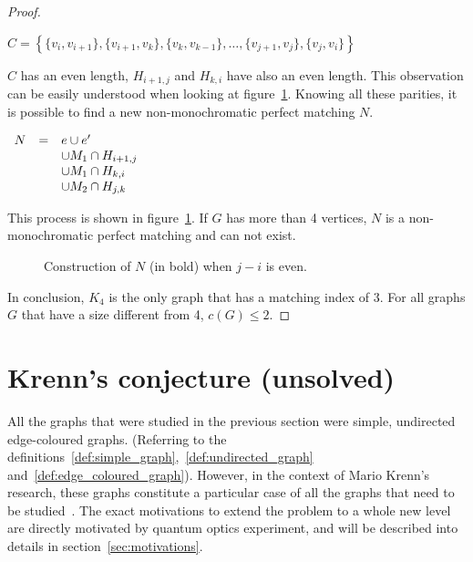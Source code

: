\begin{proof}
\begin{itemize}
            \begin{center}
                $C = \left\{
                    \{v_i, v_{i + 1}\}, \{v_{i+1}, v_k\}, \{v_k, v_{k - 1}\}, \dots, \{v_{j+1}, v_j\}, \{v_j, v_i\}
                \right\}$
            \end{center}
            
            $C$ has an even length, $H_{i+1, j}$ and $H_{k, i}$ have also an even length.
            This observation can be easily understood when looking at figure~\ref{fig:proof_simplified_even}.
            Knowing all these parities, it is possible to find a new non-monochromatic perfect matching $N$.
            
            \begin{center}
                $\begin{array}{r c l}
                    N & = & e \cup e' \\
                      &   & \cup M_1 \cap H_{i+1, j} \\
                      &   & \cup M_1 \cap H_{k, i} \\
                      &   & \cup M_2 \cap H_{j, k}
                \end{array}$
            \end{center}
            
            This process is shown in figure~\ref{fig:proof_simplified_even}.
            If $G$ has more than 4 vertices, $N$ is a non-monochromatic perfect matching and can not exist.
            
            \begin{figure}[H]
                \caption{Construction of $N$ (in bold) when $j - i$ is even.}
                \label{fig:proof_simplified_even}
            \end{figure}
    \end{itemize}

    In conclusion, $K_4$ is the only graph that has a matching index of 3.
    For all graphs $G$ that have a size different from 4, $c(G) \leq 2$.
\end{proof}


\section{Krenn's conjecture (unsolved)}
\label{sec:krenn_conjecture}

All the graphs that were studied in the previous section were simple, undirected edge-coloured graphs.
(Referring to the definitions~\ref{def:simple_graph},~\ref{def:undirected_graph} and~\ref{def:edge_coloured_graph}).
However, in the context of Mario Krenn's research, these graphs constitute a particular case of all the graphs that need to be studied~\cite{Krenn_2017,wordpress}.
The exact motivations to extend the problem to a whole new level are directly motivated by quantum optics experiment, and will be described into details in section~\ref{sec:motivations}.

